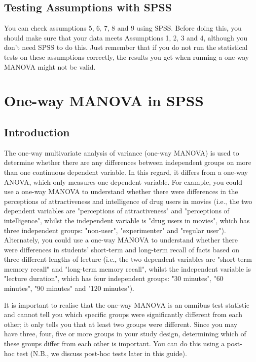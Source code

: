 \documentclass[a4paper,12pt]{article}
\begin{document}
\subsection{Testing Assumptions with SPSS}
You can check assumptions 5, 6, 7, 8 and 9 using SPSS. Before doing this, you should make sure that your data meets Assumptions 1, 2, 3 and 4, although you don't need SPSS to do this. Just remember that if you do not run the statistical tests on these assumptions correctly, the results you get when running a one-way MANOVA might not be valid.
\newpage

\section{One-way MANOVA in SPSS}

\subsection{Introduction}
The one-way multivariate analysis of variance (one-way MANOVA) is used to determine whether there are any differences between independent groups on more than one continuous dependent variable. In this regard, it differs from a one-way ANOVA, which only measures one dependent variable. For example, you could use a one-way MANOVA to understand whether there were differences in the perceptions of attractiveness and intelligence of drug users in movies (i.e., the two dependent variables are "perceptions of attractiveness" and "perceptions of intelligence", whilst the independent variable is "drug users in movies", which has three independent groups: "non-user", "experimenter" and "regular user"). Alternately, you could use a one-way MANOVA to understand whether there were differences in students' short-term and long-term recall of facts based on three different lengths of lecture (i.e., the two dependent variables are "short-term memory recall" and "long-term memory recall", whilst the independent variable is "lecture duration", which has four independent groups: "30 minutes", "60 minutes", "90 minutes" and "120 minutes").

It is important to realise that the one-way MANOVA is an omnibus test statistic and cannot tell you which specific groups were significantly different from each other; it only tells you that at least two groups were different. Since you may have three, four, five or more groups in your study design, determining which of these groups differ from each other is important. You can do this using a post-hoc test (N.B., we discuss post-hoc tests later in this guide).
\end{document}
